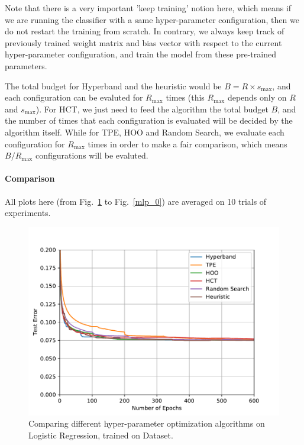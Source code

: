 \documentclass[twoside,11pt]{article}
\begin{document}
Note that there is a very important 'keep training' notion here, which means if we are running the classifier with a same hyper-parameter configuration, then we do not restart the training from scratch. In contrary, we always keep track of previously trained weight matrix and bias vector with respect to the current hyper-parameter configuration, and train the model from these pre-trained parameters. 

The total budget for Hyperband and the heuristic would be $B = R\times s_{\max}$, and each configuration can be evaluted for $R_{\max}$ times (this $R_{\max}$ depends only on $R$ and $s_{\max}$). For HCT, we just need to feed the algorithm the total budget $B$, and the number of times that each configuration is evaluated will be decided by the algorithm itself. While for TPE, HOO and Random Search, we  evaluate each configuration for $R_{\max}$ times in order to make a fair comparison, which means $B/R_{\max}$ configurations will be evaluted.

\paragraph{\textbf{Comparison}}
All plots here (from Fig.~\ref{logistic_1} to Fig.~\ref{mlp_0}) are averaged on 10 trials of experiments.

\begin{figure}[ht]
    \centering
    \includegraphics[scale=0.8]{img/mnist/logistic_1.pdf}
    \caption{Comparing different hyper-parameter optimization algorithms on Logistic Regression, trained on \MNIST Dataset.}
    \label{logistic_1}
\end{figure}
\end{document}
